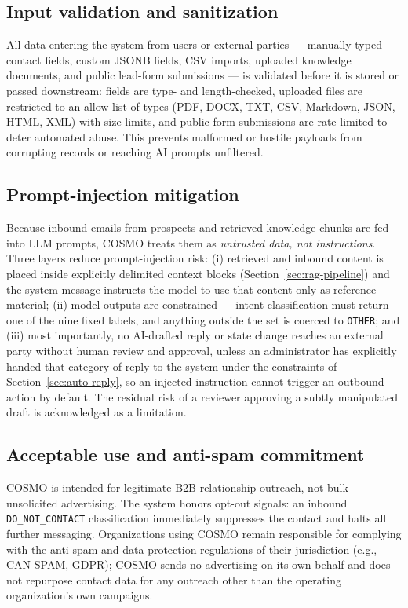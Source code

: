 \documentclass[a4paper]{article}
\begin{document}
\subsection{Input validation and sanitization}
All data entering the system from users or external parties --- manually typed
contact fields, custom JSONB fields, CSV imports, uploaded knowledge documents,
and public lead-form submissions --- is validated before it is stored or passed
downstream: fields are type- and length-checked, uploaded files are restricted
to an allow-list of types
(PDF, DOCX, TXT, CSV, Markdown, JSON, HTML, XML) with size limits, and public form submissions are rate-limited
to deter automated abuse. This prevents malformed or hostile payloads from
corrupting records or reaching AI prompts unfiltered.

\subsection{Prompt-injection mitigation}
Because inbound emails from prospects and retrieved knowledge chunks are fed into
LLM prompts, COSMO treats them as \emph{untrusted data, not instructions}. Three
layers reduce prompt-injection risk: (i) retrieved and inbound content is placed
inside explicitly delimited context blocks (Section~\ref{sec:rag-pipeline}) and
the system message instructs the model to use that content only as reference
material; (ii) model outputs are constrained --- intent classification must
return one of the nine fixed labels, and anything outside the set is coerced to
\texttt{OTHER}; and (iii) most importantly, no AI-drafted reply or state change
reaches an external party without human review and approval, unless an
administrator has explicitly handed that category of reply to the system under
the constraints of Section~\ref{sec:auto-reply}, so an injected instruction
cannot trigger an outbound action by default. The residual risk of
a reviewer approving a subtly manipulated draft is acknowledged as a limitation.

\subsection{Acceptable use and anti-spam commitment}
COSMO is intended for legitimate B2B relationship outreach, not bulk unsolicited
advertising. The system honors opt-out signals: an inbound \texttt{DO\_NOT\_CONTACT}
classification immediately suppresses the contact and halts all further messaging.
Organizations using COSMO remain responsible for complying with the anti-spam and
data-protection regulations of their jurisdiction (e.g., CAN-SPAM, GDPR); COSMO
sends no advertising on its own behalf and does not repurpose contact data for any
outreach other than the operating organization's own campaigns.
\end{document}

